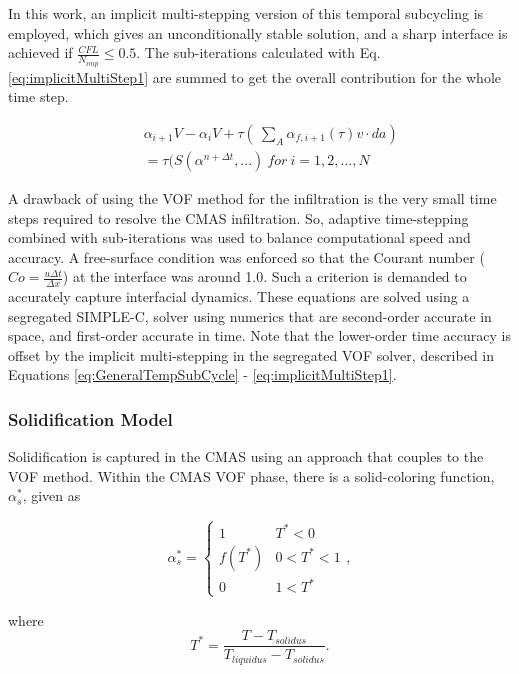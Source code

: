 \documentclass[%
 aip,
 amsmath,amssymb,
 reprint,%
floatfix]{revtex4-1}
\begin{document}
\noindent In this work, an implicit multi-stepping version of this temporal subcycling is employed, which gives an unconditionally stable solution, and a sharp interface is achieved if $\frac{CFL}{N_{imp}} \leqslant 0.5 $. The sub-iterations calculated with Eq. \ref{eq:implicitMultiStep1} are summed to get the overall contribution for the whole time step.

\begin{eqnarray}
\label{eq:implicitMultiStep1}
    &&\alpha_{i+1}V - \alpha_{i}V + \tau( \ \sum_{A}\alpha_{f,i+1}(\tau) v \cdot da) \nonumber \\
    &&=\tau(S(\alpha^{n+\Delta t},...) ~ for~ i = 1, 2, ..., N
\end{eqnarray}

A drawback of using the VOF method for the infiltration is the very small time steps required to resolve the CMAS infiltration. So, adaptive time-stepping combined with sub-iterations was used to balance computational speed and accuracy. A free-surface condition was enforced so that the Courant number ($Co = \frac{u \Delta t}{\Delta x}$) at the interface was around 1.0. Such a criterion is demanded to accurately capture interfacial dynamics. 
These equations are solved using a segregated SIMPLE-C, solver using numerics that are second-order accurate in space, and first-order accurate in time. Note that the lower-order time accuracy is offset by the implicit multi-stepping in the segregated VOF solver, described in Equations \ref{eq:GeneralTempSubCycle} - \ref{eq:implicitMultiStep1}. 

\subsubsection{Solidification Model}
\label{sec:solidmodel}
Solidification is captured in the CMAS using an approach that couples to the VOF method. Within the CMAS VOF phase, there is a solid-coloring function, $\alpha_s^*$, given as   

\begin{equation}
    \alpha^{*}_{s} = \begin{cases}
    1 & T^{*} < 0 \\
    f(T^{*})& 0<T^{*}<1 \\
    0& 1 < T^{*}
    \end{cases},
    \label{eq:solidificationModel}
\end{equation}

\noindent where
\begin{equation}
    T^{*} = \frac{T - T_{solidus}}{T_{liquidus} - T_{solidus}}.
\end{equation}
\end{document}
